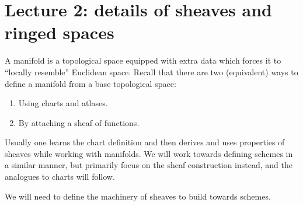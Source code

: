 \newpage


\section*{Lecture 2: details of sheaves and ringed spaces}


\begin{remark}
    A manifold is a topological space equipped with extra data which forces it to ``locally resemble'' Euclidean space. Recall that there are two (equivalent) ways to define a manifold from a base topological space:
    \begin{enumerate}
        \item Using charts and atlases.
        \item By attaching a sheaf of functions.
    \end{enumerate}

    Usually one learns the chart definition and then derives and uses properties of sheaves while working with manifolds. We will work towards defining schemes in a similar manner, but primarily focus on the sheaf construction instead, and the analogues to charts will follow.
\end{remark}

We will need to define the machinery of sheaves to build towards schemes.


